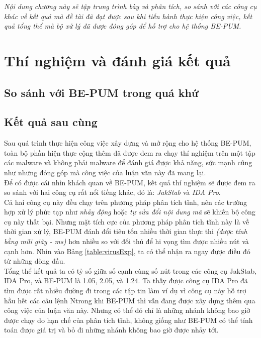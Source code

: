 
\begin{concept}[15cm]
\textit{Nội dung chương này sẽ tập trung trình bày và phân tích, so sánh với các công cụ khác về kết quả mà đề tài đã đạt được sau khi tiến hành thực hiện công việc, kết quả tổng thể mà bộ xử lý đã được đóng góp để hỗ trợ cho hệ thống BE-PUM.}
\end{concept}

\section{Thí nghiệm và đánh giá kết quả}
	\subsection{So sánh với BE-PUM trong quá khứ}

	\subsection {Kết quả sau cùng}

Sau quá trình thực hiện công việc xây dựng và mở rộng cho hệ thống BE-PUM, toàn bộ phần hiện thực cộng thêm đã được đem ra chạy thí nghiệm trên một tập các malware và không phải malware để đánh giá được khả năng, sức mạnh cũng như những đóng góp mà công việc của luận văn này đã mang lại. \\

Để có được cái nhìn khách quan về BE-PUM, kết quả thí nghiệm sẽ được đem ra so sánh với hai công cụ rất nổi tiếng khác, đó là: \textit{JakStab} và \textit{IDA Pro}.\\

Cả hai công cụ này đều chạy trên phương pháp phân tích tĩnh, nên các trường hợp xử lý phức tạp như \textit{nhảy động} hoặc \textit{tự sửa đổi nội dung mã} sẽ khiến bộ công cụ này thất bại. Nhưng mặt tích cực của phương pháp phân tích tĩnh này là về thời gian xử lý, BE-PUM đánh đổi tiêu tốn nhiều thời gian thực thi \textit{(được tính bằng mili giây - ms)} hơn nhiều so với đối thủ để hi vọng tìm được nhiều nút và cạnh hơn. Nhìn vào Bảng \ref{table:virusExp}, ta có thể nhận ra ngay được điều đó từ những dòng đầu. \\

Tổng thể kết quả ta có tỷ số giữa số cạnh cùng số nút trong các công cụ JakStab, IDA Pro, và BE-PUM là 1.05, 2.05, và 1.24. Ta thấy được công cụ IDA Pro đã tìm được rất nhiều đường đi trong các tập tin làm ví dụ vì công cụ này hỗ trợ hầu hết các câu lệnh Ntrong khi BE-PUM thì vẫn đang được xây dựng thêm qua công việc của luận văn này. Nhưng có thể đó chỉ là những nhánh không bao giờ được chạy do hạn chế của phân tích tĩnh, không giống như BE-PUM có thể tính toán được giá trị và bỏ đi những nhánh không bao giờ được nhảy tới.

